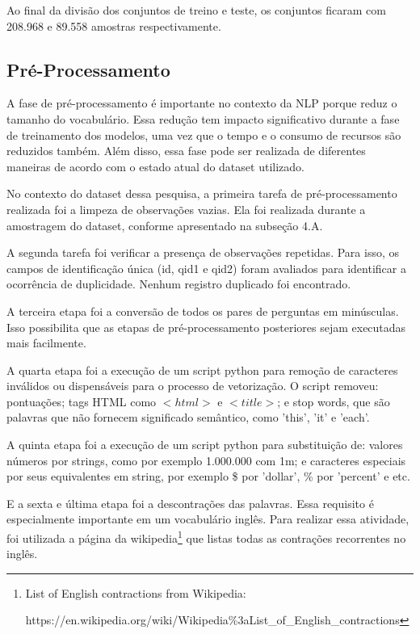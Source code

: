 \documentclass[conference]{IEEEtran}
\begin{document}
Ao final da divisão dos conjuntos de treino e teste, os conjuntos ficaram com 208.968 e 89.558 amostras respectivamente.

\subsection{Pré-Processamento}

A fase de pré-processamento é importante no contexto da NLP porque reduz o tamanho do vocabulário. Essa redução tem impacto significativo durante a fase de treinamento dos modelos, uma vez que o tempo e o consumo de recursos são reduzidos também. Além disso, essa fase pode ser realizada de diferentes maneiras de acordo com o estado atual do dataset utilizado.

No contexto do dataset dessa pesquisa, a primeira tarefa de pré-processamento realizada foi a limpeza de observações vazias. Ela foi realizada durante a amostragem do dataset, conforme apresentado na subseção 4.A.

A segunda tarefa foi verificar a presença de observações repetidas. Para isso, os campos de identificação única (id, qid1 e qid2) foram avaliados para identificar a ocorrência de duplicidade. Nenhum registro duplicado foi encontrado.

A terceira etapa foi a conversão de todos os pares de perguntas em minúsculas. Isso possibilita que as etapas de pré-processamento posteriores sejam executadas mais facilmente.

A quarta etapa foi a execução de um script python para remoção de caracteres inválidos ou dispensáveis para o processo de vetorização. O script removeu:
pontuações; tags HTML como $<html>$ e $<title>$; e stop words, que são palavras que não fornecem significado semântico, como 'this', 'it' e 'each'.

A quinta etapa foi a execução de um script python para substituição de: valores números por strings, como por exemplo 1.000.000 com 1m; e caracteres especiais por seus equivalentes em string, por exemplo \$ por 'dollar', \% por 'percent' e etc.

E a sexta e última etapa foi a descontrações das palavras. Essa requisito é especialmente importante em um vocabulário inglês. Para realizar essa atividade, foi utilizada a página da wikipedia\footnote{List of English contractions from Wikipedia:

https://en.wikipedia.org/wiki/Wikipedia\%3aList\_of\_English\_contractions} que listas todas as contrações recorrentes no inglês.
\end{document}
